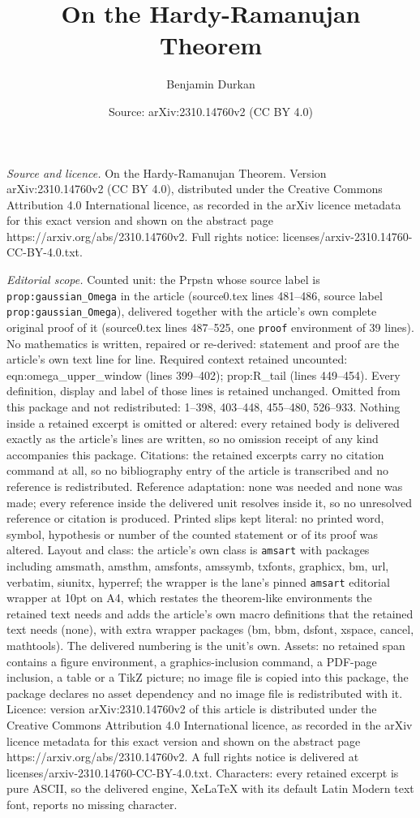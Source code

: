 \documentclass[10pt,a4paper]{amsart}
\title[On the Hardy-Ramanujan Theorem]{On the Hardy-Ramanujan Theorem}
\author{Benjamin Durkan}
\date{Source: arXiv:2310.14760v2 (CC BY 4.0)}
\begin{document}
\maketitle

\noindent\emph{Source and licence.} On the Hardy-Ramanujan Theorem. Version arXiv:2310.14760v2 (CC BY 4.0), distributed under the Creative Commons Attribution 4.0 International licence, as recorded in the arXiv licence metadata for this exact version and shown on the abstract page https://arxiv.org/abs/2310.14760v2. Full rights notice: licenses/arxiv-2310.14760-CC-BY-4.0.txt.\par\smallskip

\noindent\textit{Editorial scope.} Counted unit: the Prpstn whose source label is \texttt{prop:gaussian\_Omega} in the article (source0.tex lines 481--486, source label \texttt{prop:gaussian\_Omega}), delivered together with the article's own complete original proof of it (source0.tex lines 487--525, one \texttt{proof} environment of 39 lines). No mathematics is written, repaired or re-derived: statement and proof are the article's own text line for line. Required context retained uncounted: eqn:omega\_upper\_window (lines 399--402); prop:R\_tail (lines 449--454). Every definition, display and label of those lines is retained unchanged. Omitted from this package and not redistributed: 1--398, 403--448, 455--480, 526--933. Nothing inside a retained excerpt is omitted or altered: every retained body is delivered exactly as the article's lines are written, so no omission receipt of any kind accompanies this package. Citations: the retained excerpts carry no citation command at all, so no bibliography entry of the article is transcribed and no reference is redistributed. Reference adaptation: none was needed and none was made; every reference inside the delivered unit resolves inside it, so no unresolved reference or citation is produced. Printed slips kept literal: no printed word, symbol, hypothesis or number of the counted statement or of its proof was altered. Layout and class: the article's own class is \texttt{amsart} with packages including amsmath, amsthm, amsfonts, amssymb, txfonts, graphicx, bm, url, verbatim, siunitx, hyperref; the wrapper is the lane's pinned \texttt{amsart} editorial wrapper at 10pt on A4, which restates the theorem-like environments the retained text needs and adds the article's own macro definitions that the retained text needs (none), with extra wrapper packages (bm, bbm, dsfont, xspace, cancel, mathtools). The delivered numbering is the unit's own. Assets: no retained span contains a figure environment, a graphics-inclusion command, a PDF-page inclusion, a table or a TikZ picture; no image file is copied into this package, the package declares no asset dependency and no image file is redistributed with it. Licence: version arXiv:2310.14760v2 of this article is distributed under the Creative Commons Attribution 4.0 International licence, as recorded in the arXiv licence metadata for this exact version and shown on the abstract page https://arxiv.org/abs/2310.14760v2. A full rights notice is delivered at licenses/arxiv-2310.14760-CC-BY-4.0.txt. Characters: every retained excerpt is pure ASCII, so the delivered engine, XeLaTeX with its default Latin Modern text font, reports no missing character.
\end{document}
